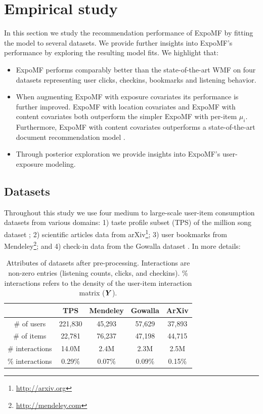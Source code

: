 \section{Empirical study}
\label{sec:experiments}

In this section we study the recommendation performance of ExpoMF by fitting
the model to several datasets. We provide further insights into ExpoMF's
performance by exploring the resulting model fits. We highlight that: 
\begin{itemize} 
\item ExpoMF performs comparably better than the state-of-the-art WMF
\cite{hu2008collaborative} on four datasets representing user clicks, checkins,
bookmarks and listening behavior.
\item When augmenting ExpoMF with exposure covariates its performance is
further improved. ExpoMF with location covariates and ExpoMF with content
covariates both outperform the simpler ExpoMF with per-item $\mu_i$.
Furthermore, ExpoMF with content covariates outperforms a state-of-the-art
document recommendation model \cite{wang2011collaborative}.  
\item Through posterior exploration we provide insights into ExpoMF's user-exposure modeling.
\end{itemize} 

\subsection{Datasets}
Throughout this study we use four medium to large-scale user-item consumption datasets from various domains: 
1) taste profile subset (TPS) of the million song dataset \cite{bertin2011million}; 2) scientific articles data from
arXiv\footnote{\url{http://arxiv.org}}; 3) user bookmarks from Mendeley\footnote{\url{http://mendeley.com}}; and 4) check-in
data from the Gowalla dataset \cite{cho2011friendship}. In more details:

\begin{table}
\centering
\begin{tabular}{ c c c c c  }
  \hline
   & \textbf{TPS} & \textbf{Mendeley} & \textbf{Gowalla} & \textbf{ArXiv} \\
   \hline
  \# of users & 221,830 & 45,293 & 57,629 & 37,893   \\
  \# of items & 22,781& 76,237 & 47,198 & 44,715 \\
  \# interactions & 14.0M &  2.4M & 2.3M & 2.5M\\
  $\%$ interactions & 0.29\% & 0.07\% & 0.09\% & 0.15\%\\
  \hline 
\end{tabular}
\caption{Attributes of datasets after pre-processing. Interactions are non-zero
entries (listening counts, clicks, and checkins). \% interactions refers to the
density of the user-item interaction matrix ($\boldsymbol{Y}$).}
\label{tab:data}
\end{table}

